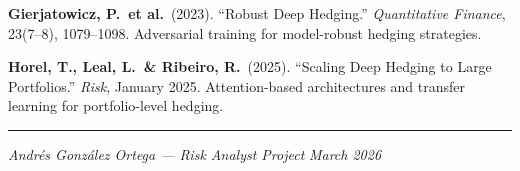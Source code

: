 \documentclass[11pt, a4paper]{article}
\theoremstyle{definition}
\theoremstyle{plain}
\theoremstyle{remark}
\begin{document}
\begin{enumerate}[label={[\arabic*]}, leftmargin=2cm]
    \item \textbf{Gierjatowicz, P.\ et al.}\ (2023).
          ``Robust Deep Hedging.''
          \emph{Quantitative Finance}, 23(7--8), 1079--1098.
          Adversarial training for model-robust hedging strategies.

    \item \textbf{Horel, T., Leal, L.\ \& Ribeiro, R.}\ (2025).
          ``Scaling Deep Hedging to Large Portfolios.''
          \emph{Risk}, January 2025.
          Attention-based architectures and transfer learning for portfolio-level hedging.
\end{enumerate}

\vfill
\hrule
\smallskip
\noindent\textit{Andr\'es Gonz\'alez Ortega --- Risk Analyst Project} \hfill \textit{March 2026}
\end{document}
